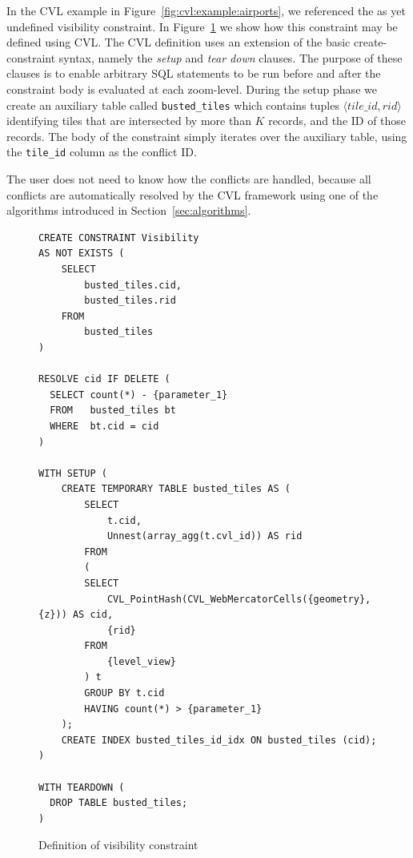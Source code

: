 In the CVL example in Figure~\ref{fig:cvl:example:airports}, we referenced the as yet undefined visibility constraint. In Figure~\ref{fig:visibility:definition} we show how this constraint may be defined using CVL. The CVL definition uses an extension of the basic create-constraint syntax, namely the \emph{setup} and \emph{tear down} clauses. 
The purpose of these clauses is to enable arbitrary SQL statements to be run before and after the constraint body is evaluated at each zoom-level. During the setup phase we create an auxiliary table called \texttt{busted\_tiles} which contains tuples $\langle tile\_id, rid \rangle$ identifying tiles that are intersected by more than $K$ records, and the ID of those records. The body of the constraint simply iterates over the auxiliary table, using the \texttt{tile\_id} column as the conflict ID.

The user does not need to know how the conflicts are handled, because all conflicts are automatically resolved by the CVL framework using one of the algorithms introduced in Section~\ref{sec:algorithms}.


\begin{figure}[htbp]
\begin{center}
\begin{lstlisting}
CREATE CONSTRAINT Visibility
AS NOT EXISTS (
    SELECT
        busted_tiles.cid,
        busted_tiles.rid
    FROM
        busted_tiles
)

RESOLVE cid IF DELETE (
  SELECT count(*) - {parameter_1}
  FROM   busted_tiles bt
  WHERE  bt.cid = cid
)

WITH SETUP (
    CREATE TEMPORARY TABLE busted_tiles AS (
        SELECT
            t.cid,
            Unnest(array_agg(t.cvl_id)) AS rid
        FROM
        (
        SELECT
            CVL_PointHash(CVL_WebMercatorCells({geometry}, {z})) AS cid,
            {rid}
        FROM
            {level_view}
        ) t
        GROUP BY t.cid
        HAVING count(*) > {parameter_1}
    );
    CREATE INDEX busted_tiles_id_idx ON busted_tiles (cid);
)

WITH TEARDOWN (
  DROP TABLE busted_tiles;
)
\end{lstlisting}
\caption{Definition of visibility constraint}
\label{fig:visibility:definition}
\end{center}
\end{figure}


